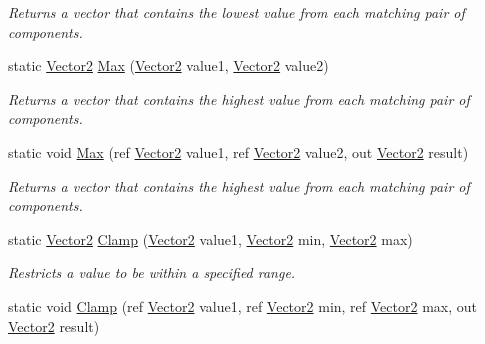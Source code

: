 \begin{DoxyCompactItemize}
\begin{DoxyCompactList}\small\item\em Returns a vector that contains the lowest value from each matching pair of components.\end{DoxyCompactList}\item 
static \hyperlink{struct_microsoft_1_1_xna_1_1_framework_1_1_vector2}{Vector2} \hyperlink{struct_microsoft_1_1_xna_1_1_framework_1_1_vector2_ac53cc49e4f898bff61dac9161b0fe84e}{Max} (\hyperlink{struct_microsoft_1_1_xna_1_1_framework_1_1_vector2}{Vector2} value1, \hyperlink{struct_microsoft_1_1_xna_1_1_framework_1_1_vector2}{Vector2} value2)
\begin{DoxyCompactList}\small\item\em Returns a vector that contains the highest value from each matching pair of components.\end{DoxyCompactList}\item 
static void \hyperlink{struct_microsoft_1_1_xna_1_1_framework_1_1_vector2_aa62255b815297a777794f8b2b4abc526}{Max} (ref \hyperlink{struct_microsoft_1_1_xna_1_1_framework_1_1_vector2}{Vector2} value1, ref \hyperlink{struct_microsoft_1_1_xna_1_1_framework_1_1_vector2}{Vector2} value2, out \hyperlink{struct_microsoft_1_1_xna_1_1_framework_1_1_vector2}{Vector2} result)
\begin{DoxyCompactList}\small\item\em Returns a vector that contains the highest value from each matching pair of components.\end{DoxyCompactList}\item 
static \hyperlink{struct_microsoft_1_1_xna_1_1_framework_1_1_vector2}{Vector2} \hyperlink{struct_microsoft_1_1_xna_1_1_framework_1_1_vector2_a2c43d406f0b0c470776dd4e87a77ed7d}{Clamp} (\hyperlink{struct_microsoft_1_1_xna_1_1_framework_1_1_vector2}{Vector2} value1, \hyperlink{struct_microsoft_1_1_xna_1_1_framework_1_1_vector2}{Vector2} min, \hyperlink{struct_microsoft_1_1_xna_1_1_framework_1_1_vector2}{Vector2} max)
\begin{DoxyCompactList}\small\item\em Restricts a value to be within a specified range.\end{DoxyCompactList}\item 
static void \hyperlink{struct_microsoft_1_1_xna_1_1_framework_1_1_vector2_a807ed79b593c323a0568089da719a622}{Clamp} (ref \hyperlink{struct_microsoft_1_1_xna_1_1_framework_1_1_vector2}{Vector2} value1, ref \hyperlink{struct_microsoft_1_1_xna_1_1_framework_1_1_vector2}{Vector2} min, ref \hyperlink{struct_microsoft_1_1_xna_1_1_framework_1_1_vector2}{Vector2} max, out \hyperlink{struct_microsoft_1_1_xna_1_1_framework_1_1_vector2}{Vector2} result)

\end{DoxyCompactItemize}
